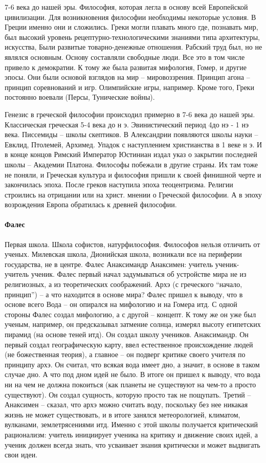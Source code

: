 \documentclass[a4paper, 12pt]{article}
\begin{document}
7-6 века до нашей эры. Философия, которая легла в основу всей Европейской цивилизации. Для возникновения философии необходимы некоторые условия. В Греции именно они и сложились. Греки могли плавать много где, познавать мир, был высокий уровень рецептурно-технологическими знаниями типа архитектуры, искусства, Были развитые товарно-денежные отношения. Рабский труд был, но не являлся основным. Основу составляли свободные люди. Все это в том числе привело к демократии. К тому же была развитая мифология, Гомер, и другие эпосы. Они были основой взглядов на мир -- мировоззрения. Принцип агона -- принцип соревнований и игр. Олимпийские игры, например. Кроме того, Греки постоянно воевали (Персы, Тунические войны). 

Генезис в греческой философии происходил примерно в 7-6 века до нашей эры. Классическая греческая 5-4 века до н э. Эвинистический период 4до нэ - 1 нэ века. Писсемиды -- школы скептиков. В Александрии появляются школы науки -- Евклид, Птолемей, Архимед. Упадок с наступлением христианства в 1 веке н э. И в конце концов Римский Император Юстиниан издал указ о закрытии последней школы -- Академии Платона. Философы побежали в другие страны. Их там тоже не поняли, и Греческая культура и философия пришли к своей финишной черте и закончилась эпоха. После греков наступила эпоха теоцентризма. Религии строились на отрицании или на христ. мнении о Греческой философии. А в эпоху возрождения Европа обратилась к древней философии. 

\paragraph{Фалес}
Первая школа. Школа софистов, натурфилософия. Философов нельзя отличить от ученых. Милевская школа, Дионийская школа, возникали все на периферии государства, не в центре. Фалес Анаксимандр Анаксимен: учитель ученик-учитель ученик. Фалес первый начал задумываться об устройстве мира не из религиозных, а из теоретических соображений. Архэ (с греческого ``начало, принцип'') -- а что находится в основе мира? Фалес пришел к выводу, что в основе всего Вода -- он опирался на мифологию и на Гомера итд. С одной стороны Фалес создал мифологию, а с другой -- концепт. К тому же он уже был ученым, например, он предсказывал затмение солнца, измерял высоту египетских пирамид (на основе теней итд). Он создал школу учеников. Анаксимандр. Он первый создал географическую карту, ввел естественное происхождение людей (не божественная теория), а главное -- он подверг критике своего учителя по принципу архэ. Он считал, что всякая вода имеет дно, а значит, в основе в таком случае дно. А что под дном идей не было. В итоге он пришел к выводу, что вода ни на чем не должна покоиться (как планеты не существуют на чем-то а просто существуют). Он создал сущность, которую просто так не пощупать. Третий -- Анаксимен -- сказал, что архэ можно считать воду, поскольку без нее никакая жизнь не может существовать, и в итоге занялся метеорологией, климатом, вулканами, землетрясениями итд. Именно с этой школы получается критический рационализм: учитель инициирует ученика на критику и движение своих идей, а ученик должен всегда знать, что усваивает знания критически и может выдвигать свои идеи.
\end{document}
